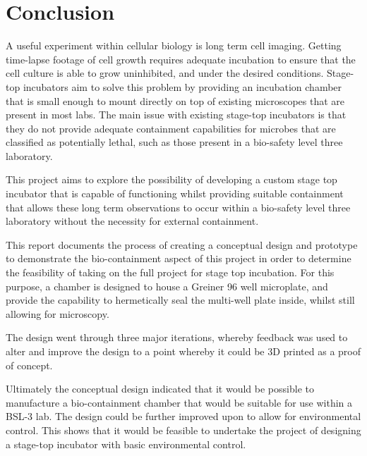 \documentclass[class=report,11pt,crop=false]{standalone}
\begin{document}
\chapter{Conclusion} \label{ch:conclusion}
\vspace{-1cm}




A useful experiment within cellular biology is long term cell imaging. Getting time-lapse footage of cell growth requires adequate incubation to ensure that the cell culture is able to grow uninhibited, and under the desired conditions. Stage-top incubators aim to solve this problem by providing an incubation chamber that is small enough to mount directly on top of existing microscopes that are present in most labs. The main issue with existing stage-top incubators is that they do not provide adequate containment capabilities for microbes that are classified as potentially lethal, such as those present in a bio-safety level three laboratory. 

This project aims to explore the possibility of developing a custom stage top incubator that is capable of functioning whilst providing suitable containment that allows these long term observations to occur within a bio-safety level three laboratory without the necessity for external containment.

This report documents the process of creating a conceptual design and prototype to demonstrate the bio-containment aspect of this project in order to determine the feasibility of taking on the full project for stage top incubation. For this purpose, a chamber is designed to house a Greiner 96 well microplate, and provide the capability to hermetically seal the multi-well plate inside, whilst still allowing for microscopy.

The design went through three major iterations, whereby feedback was used to alter and improve the design to a point whereby it could be 3D printed as a proof of concept.

Ultimately the conceptual design indicated that it would be possible to manufacture a bio-containment chamber that would be suitable for use within a BSL-3 lab. The design could be further improved upon to allow for environmental control. This shows that it would be feasible to undertake the project of designing a stage-top incubator with basic environmental control. 
\end{document}
